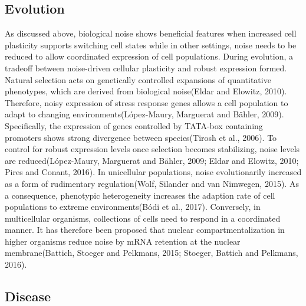 \subsection{Evolution}

As discussed above, biological noise shows beneficial features when increased cell plasticity supports switching cell states while in other settings, noise needs to be reduced to allow coordinated expression of cell populations. During evolution, a tradeoff between noise-driven cellular plasticity and robust expression formed. Natural selection acts on genetically controlled expansions of quantitative phenotypes, which are derived from biological noise(Eldar and Elowitz, 2010). Therefore, noisy expression of stress response genes allows a cell population to adapt to changing environments(López-Maury, Marguerat and Bähler, 2009). Specifically, the expression of genes controlled by TATA-box containing promoters shows strong divergence between species(Tirosh et al., 2006). To control for robust expression levels once selection becomes stabilizing, noise levels are reduced(López-Maury, Marguerat and Bähler, 2009; Eldar and Elowitz, 2010; Pires and Conant, 2016). 
In unicellular populations, noise evolutionarily increased as a form of rudimentary regulation(Wolf, Silander and van Nimwegen, 2015). As a consequence, phenotypic heterogeneity increases the adaption rate of cell populations to extreme environments(Bódi et al., 2017). Conversely, in multicellular organisms, collections of cells need to respond in a coordinated manner. It has therefore been proposed that nuclear compartmentalization in higher organisms reduce noise by mRNA retention at the nuclear membrane(Battich, Stoeger and Pelkmans, 2015; Stoeger, Battich and Pelkmans, 2016).

\subsection{Disease}


